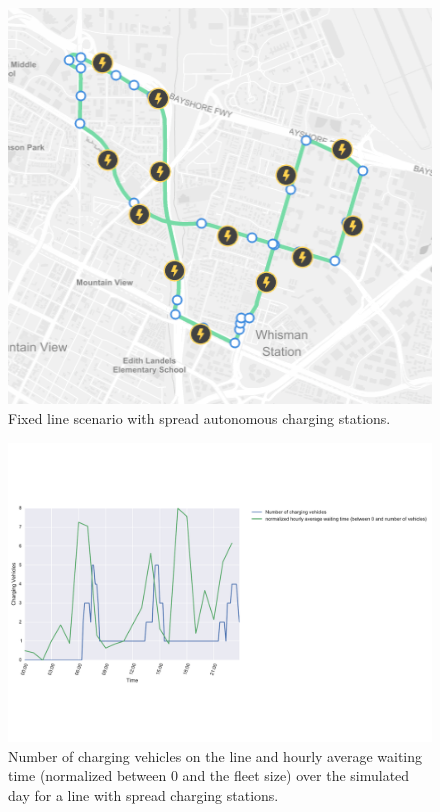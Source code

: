 \documentclass[12pt,a4paper]{article}
\begin{document}
\begin{figure}
  \centering
\includegraphics[scale=0.5]{./images/manycharging}
  \caption{Fixed line scenario with spread autonomous charging stations.}
\label{manycharging}
\end{figure}

\begin{figure}
  \centering

\includegraphics[scale=0.5]{./images/spreadcharging.pdf}
 \caption{Number of charging vehicles on the line and hourly average waiting time (normalized between 0 and the fleet size) over the simulated day for a line with spread charging stations.}
\label{spread}
\end{figure}
\end{document}
